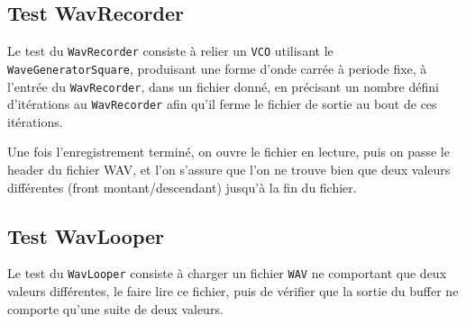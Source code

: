 \subsection{Test WavRecorder}

Le test du \verb!WavRecorder! consiste à relier un \verb!VCO!
utilisant le \verb!WaveGeneratorSquare!, produisant une forme
d'onde carrée à periode fixe, à l'entrée du \verb!WavRecorder!,
dans un fichier donné, en précisant un nombre défini d'itérations
au \verb!WavRecorder! afin qu'il ferme le fichier de sortie au bout
de ces itérations.

Une fois l'enregistrement terminé, on ouvre le fichier en lecture,
puis on passe le header du fichier WAV, et l'on s'assure que l'on
ne trouve bien que deux valeurs différentes (front
montant/descendant) jusqu'à la fin du fichier.

\subsection{Test WavLooper}

Le test du \verb!WavLooper! consiste à charger un fichier
\verb!WAV! ne comportant que deux valeurs différentes, le faire
lire ce fichier, puis de vérifier que la sortie du buffer ne
comporte qu'une suite de deux valeurs.

